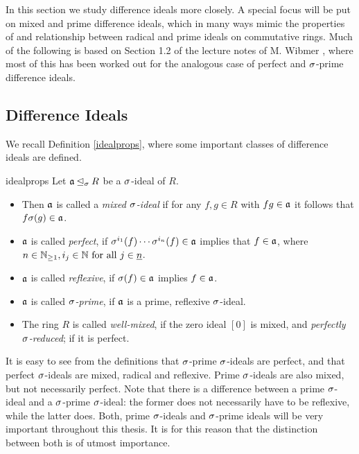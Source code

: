 In this section we study difference ideals more closely. A special focus will be put on mixed and prime difference ideals, which in many ways mimic the properties of and relationship between radical and prime ideals on commutative rings.
Much of the following is based on Section 1.2 of the lecture notes of M. Wibmer \cite{wibmer}, where most of this has been worked out for the analogous case of perfect and $\sigma$-prime difference ideals. \\

\subsection{Difference Ideals}

We recall Definition \ref{idealprops}, where some important classes of difference ideals are defined.

\begin{repdefn}{idealprops}
Let  $\mathfrak{a} \unlhd_{\sigma} R$ be a $\sigma$-ideal of $R$. 
\begin{itemize}
\item Then $\mathfrak{a}$ is called a \emph{mixed $\sigma$-ideal} if for any $f,g \in R$ with $fg \in \mathfrak{a}$ it follows that $f \sigma(g) \in \mathfrak{a}$. 
\item $\mathfrak{a}$ is called \emph{perfect}, if $\sigma^{i_1}(f) \cdots \sigma^{i_n}(f) \in \mathfrak{a}$ implies that $f \in \mathfrak{a}$, where $n \in \mathbb{N}_{\geq1}, i_j \in \mathbb{N} \text{ for all } j \in \underline{n}$. 
\item $\mathfrak{a}$ is called \emph{reflexive}, if $\sigma(f) \in \mathfrak{a}$ implies $f \in \mathfrak{a}$. 
\item $\mathfrak{a}$ is called \emph{$\sigma$-prime}, if $\mathfrak{a}$ is a prime, reflexive $\sigma$-ideal. 
\item The ring $R$ is called \emph{well-mixed}, if the zero ideal $[0]$ is mixed, and \emph{perfectly $\sigma$-reduced}; if it is perfect. 
\end{itemize}
\end{repdefn}

\begin{rem}\label{rempropideals}
It is easy to see from the definitions that $\sigma$-prime $\sigma$-ideals are perfect, and that perfect $\sigma$-ideals are mixed, radical and reflexive. Prime $\sigma$-ideals are also mixed, but not necessarily perfect. Note that there is a difference between a prime $\sigma$-ideal and a $\sigma$-prime $\sigma$-ideal:
the former does not necessarily have to be reflexive, while the latter does. Both, prime $\sigma$-ideals and $\sigma$-prime ideals will be very important throughout this thesis. It is for this reason that the distinction between both is of utmost importance.
\end{rem}


